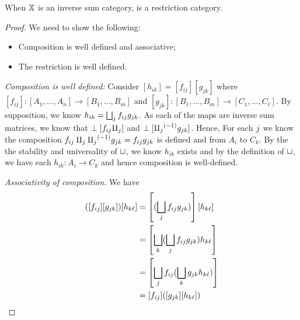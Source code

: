 \begin{lemma}\label{lem:inverse_matrix_category_is_a_restriction_category}
  When $\mathbb{X}$ is an inverse sum category, \imatx is a restriction category.
\end{lemma}
\begin{proof}
  We need to show the following:
  \begin{itemize}
    \item Composition is well defined and associative;
    \item The restriction is well defined.
  \end{itemize}

  \emph{Composition is well defined:} Consider $[h_{i k}] = [f_{i j}] [g_{j k}]$ where $[f_{i j}]:
  [A_1,\ldots, A_n] \to [B_1,\ldots, B_m]$ and $[g_{j k}]: [B_1,\ldots, B_m] \to [C_1,\ldots,
  C_\ell]$. By supposition, we know $h_{i k} = \bigsqcup_j f_{i j} g_{j k}$. As each of
  the maps are inverse sum matrices, we know that $\perp [f_{i j} \amalg_{j}]$ and
  $\perp[{\amalg_{j}}^{(-1)}g_{j k}]$. Hence, For each $j$ we know the composition $f_{i j}
  \amalg_{j} {\amalg_{j}}^{(-1)}g_{j k} = f_{i j} g_{j k}$ is defined and from $A_i$ to $C_{k}$. By
  the the stability and universality of $\sqcup$, we know $h_{i k}$ exists and by the definition of
  $\sqcup$, we have each $h_{i k}: A_i \to C_k$ and hence composition is well-defined.

  \emph{Associativity of composition.} We have
  \begin{align*}
    ([f_{i j}] [g_{j k}]) [h_{k \ell}]
        &= \left[(\bigsqcup_j f_{i j}  g_{j k})\right] [h_{k \ell}]\\
        &=\left[ \bigsqcup_k (\bigsqcup_j f_{i j} g_{j k}) h_{k \ell}\right]\\
        &=\left[ \bigsqcup_j f_{i j}  (\bigsqcup_k g_{j k} h_{k \ell})\right]\\
        &=[ f_{i j} ]  ([g_{j k}] [h_{k \ell}])
  \end{align*}


\end{proof}
